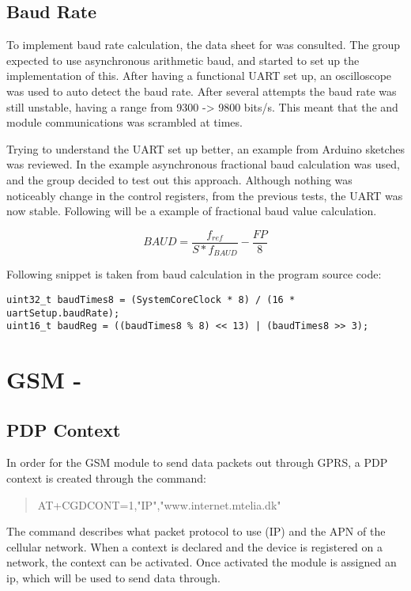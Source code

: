 \subsection{Baud Rate}
To implement baud rate calculation, the data sheet for \SAMD was consulted. The group expected to use asynchronous arithmetic baud, and started to set up the implementation of this. After having a functional UART set up, an oscilloscope was used to auto detect the baud rate. After several attempts the baud rate was still unstable, having a range from 9300 -> 9800 bits/s. This meant that the \GPS and \SARA module communications was scrambled at times.
 
Trying to understand the UART set up better, an example from Arduino sketches was reviewed. In the example asynchronous fractional baud calculation was used, and the group decided to test out this approach. Although nothing was noticeably change in the control registers, from the previous tests, the UART was now stable.
Following will be a example of fractional baud value calculation.

\[BAUD = \frac{f_{ref}}{S*f_{BAUD}} - \frac{FP}{8}\]

Following snippet is taken from baud calculation in the program source code:
\begin{verbatim}
uint32_t baudTimes8 = (SystemCoreClock * 8) / (16 * uartSetup.baudRate);
uint16_t baudReg = ((baudTimes8 % 8) << 13) | (baudTimes8 >> 3);	
\end{verbatim}

\section{GSM - \SARA}
\subsection{PDP Context}
In order for the GSM module to send data packets out through GPRS, a PDP context is created through the command:
\begin{quote}
	AT+CGDCONT=1,"IP","www.internet.mtelia.dk"
\end{quote}

The command describes what packet protocol to use (IP) and the APN of the cellular network. When a context is declared and the device is registered on a network, the context can be activated. Once activated the module is assigned an ip, which will be used to send data through.

